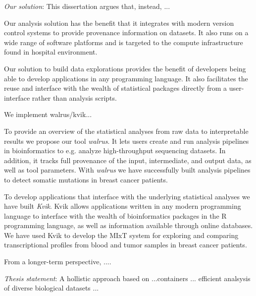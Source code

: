 \emph{Our solution}: 
This dissertation argues that, instead, ... 

Our analysis solution has the benefit that it integrates with modern version
control systems to provide provenance information on datasets. It also runs on a
wide range of software platforms and is targeted to the compute infrastructure
found in hospital environment. 

Our solution to build data explorations provides the benefit of developers being
able to develop applications in any programming language. It also facilitates
the reuse and interface with the wealth of statistical packages directly from a
user-interface rather than analysis scripts. 

We implement walrus/kvik... 

To provide an overview of the statistical analyses from raw data to
interpretable results we propose our tool \emph{walrus}. It lets users create
and run analysis pipelines in bioinformatics to e.g. analyze high-throughput
sequencing datasets. In addition, it tracks full provenance of the input,
intermediate, and output data, as well as tool parameters. With \emph{walrus} we
have successfully built analysis pipelines to detect somatic mutations in breast
cancer patients. 

To develop applications that interface with the underlying statistical analyses
we have built \emph{Kvik}. Kvik allows applications written in any modern
programming language to interface with the wealth of bioinformatics packages in
the R programming language, as well as information available through online
databases. We have used Kvik to develop the MIxT system for exploring and
comparing transcriptional profiles from blood and tumor samples in breast cancer
patients. 


From a longer-term perspective, ....

\emph{Thesis statement}:
A hollistic approach based on ...containers ... efficient analsysis of diverse
biological datasets ... 


